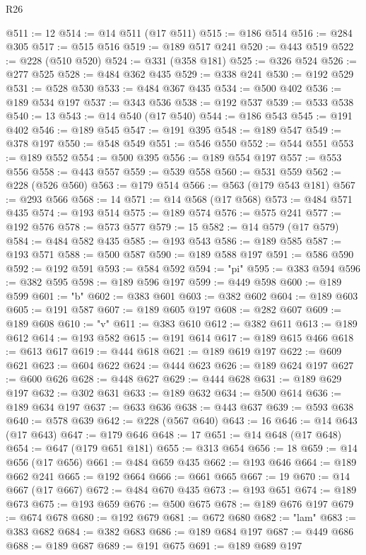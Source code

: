 \begin{lexlean}{R26}
\begin{coremodule}
@511 := 12
@514 := @14 @511 (@17 @511)
@515 := @186 @514
@516 := @284 @305
@517 := @515 @516
@519 := @189 @517 @241
@520 := @443 @519
@522 := @228 (@510 @520)
@524 := @331 (@358 @181)
@525 := @326 @524
@526 := @277 @525
@528 := @484 @362 @435
@529 := @338 @241
@530 := @192 @529
@531 := @528 @530
@533 := @484 @367 @435
@534 := @500 @402
@536 := @189 @534 @197
@537 := @343 @536
@538 := @192 @537
@539 := @533 @538
@540 := 13
@543 := @14 @540 (@17 @540)
@544 := @186 @543
@545 := @191 @402
@546 := @189 @545
@547 := @191 @395
@548 := @189 @547
@549 := @378 @197
@550 := @548 @549
@551 := @546 @550
@552 := @544 @551
@553 := @189 @552
@554 := @500 @395
@556 := @189 @554 @197
@557 := @553 @556
@558 := @443 @557
@559 := @539 @558
@560 := @531 @559
@562 := @228 (@526 @560)
@563 := @179 @514
@566 := @563 (@179 @543 @181)
@567 := @293 @566
@568 := 14
@571 := @14 @568 (@17 @568)
@573 := @484 @571 @435
@574 := @193 @514
@575 := @189 @574
@576 := @575 @241
@577 := @192 @576
@578 := @573 @577
@579 := 15
@582 := @14 @579 (@17 @579)
@584 := @484 @582 @435
@585 := @193 @543
@586 := @189 @585
@587 := @193 @571
@588 := @500 @587
@590 := @189 @588 @197
@591 := @586 @590
@592 := @192 @591
@593 := @584 @592
@594 := "pi"
@595 := @383 @594
@596 := @382 @595
@598 := @189 @596 @197
@599 := @449 @598
@600 := @189 @599
@601 := "b"
@602 := @383 @601
@603 := @382 @602
@604 := @189 @603
@605 := @191 @587
@607 := @189 @605 @197
@608 := @282 @607
@609 := @189 @608
@610 := "v"
@611 := @383 @610
@612 := @382 @611
@613 := @189 @612
@614 := @193 @582
@615 := @191 @614
@617 := @189 @615 @466
@618 := @613 @617
@619 := @444 @618
@621 := @189 @619 @197
@622 := @609 @621
@623 := @604 @622
@624 := @444 @623
@626 := @189 @624 @197
@627 := @600 @626
@628 := @448 @627
@629 := @444 @628
@631 := @189 @629 @197
@632 := @302 @631
@633 := @189 @632
@634 := @500 @614
@636 := @189 @634 @197
@637 := @633 @636
@638 := @443 @637
@639 := @593 @638
@640 := @578 @639
@642 := @228 (@567 @640)
@643 := 16
@646 := @14 @643 (@17 @643)
@647 := @179 @646
@648 := 17
@651 := @14 @648 (@17 @648)
@654 := @647 (@179 @651 @181)
@655 := @313 @654
@656 := 18
@659 := @14 @656 (@17 @656)
@661 := @484 @659 @435
@662 := @193 @646
@664 := @189 @662 @241
@665 := @192 @664
@666 := @661 @665
@667 := 19
@670 := @14 @667 (@17 @667)
@672 := @484 @670 @435
@673 := @193 @651
@674 := @189 @673
@675 := @193 @659
@676 := @500 @675
@678 := @189 @676 @197
@679 := @674 @678
@680 := @192 @679
@681 := @672 @680
@682 := "lam"
@683 := @383 @682
@684 := @382 @683
@686 := @189 @684 @197
@687 := @449 @686
@688 := @189 @687
@689 := @191 @675
@691 := @189 @689 @197

\end{coremodule}
\end{lexlean}
